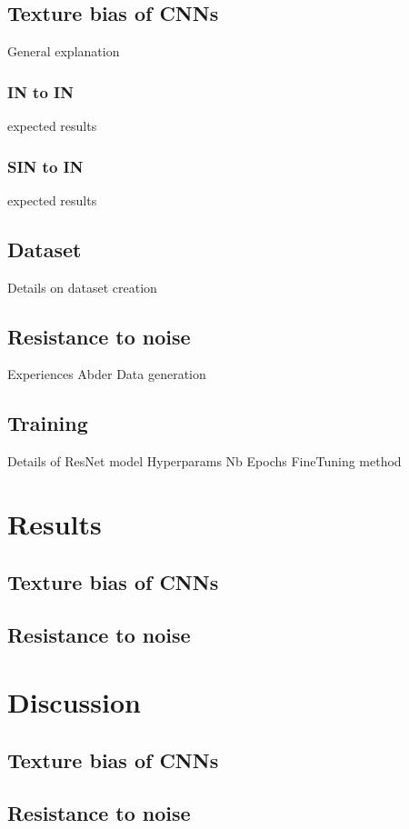 \documentclass{article}
\begin{document}
\subsection{Texture bias of CNNs}

General explanation

\subsubsection{IN to IN}
expected results
\subsubsection{SIN to IN}
expected results

\subsection{Dataset}

Details on dataset creation

\subsection{Resistance to noise}

Experiences Abder
Data generation

\subsection{Training}

Details of ResNet model
Hyperparams
Nb Epochs
FineTuning method

\section{Results}

\subsection{Texture bias of CNNs}

\subsection{Resistance to noise}


\section{Discussion}

\subsection{Texture bias of CNNs}

\subsection{Resistance to noise}


\appendix



\end{document}

